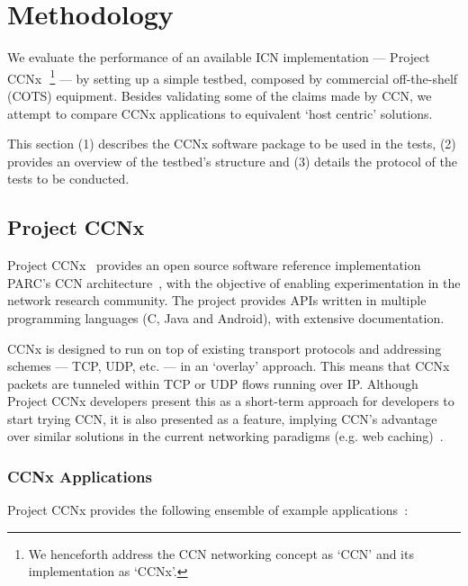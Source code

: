 \chapter{Methodology}

We evaluate the performance of an available ICN 
implementation --- Project CCNx~\cite{website:ccnx}\,\footnote{We henceforth 
address the CCN networking concept as `CCN' and its implementation as `CCNx'.} --- 
by setting up a simple testbed, composed by commercial off-the-shelf (COTS) 
equipment. Besides validating some of the claims made by CCN, we attempt to 
compare CCNx applications to equivalent `host centric' solutions.\vertbreak

This section (1) describes the CCNx software 
package to be used in the tests, (2) provides an overview of the testbed's 
structure and (3) details the protocol of the tests to be conducted.

\section{Project CCNx}

Project CCNx~\cite{website:ccnx} provides an open source software reference 
implementation PARC's CCN architecture~\cite{Jacobson2009}, with the 
objective of enabling experimentation in the network research community. The 
project provides APIs written in multiple programming languages (C, Java and 
Android), with extensive documentation.\vertbreak

CCNx is designed to run on top of 
existing transport protocols and addressing schemes --- TCP, UDP, 
etc. --- in an `overlay' approach. This means that CCNx packets are tunneled 
within TCP or UDP flows running over IP. Although Project CCNx developers 
present this as a short-term approach for developers to start trying 
CCN, it is also presented as a feature, implying CCN's advantage over similar 
solutions in the current networking paradigms (e.g. web 
caching)~\cite{Jacobson2009,website:ccnx,Willis2012,Melazzi2012}.

\subsection{CCNx Applications}

Project CCNx 
provides the following ensemble of example applications~\cite{Muther2012a}:

